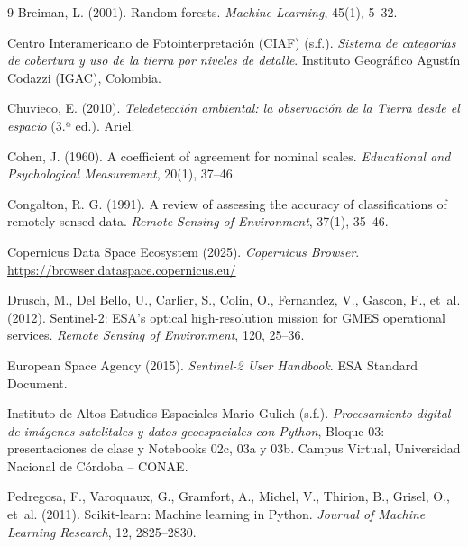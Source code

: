 \documentclass[11pt,letterpaper]{article}
\begin{document}
\begin{thebibliography}{9}
Breiman, L. (2001). Random forests. \textit{Machine Learning}, 45(1), 5--32.

Centro Interamericano de Fotointerpretación (CIAF) (s.f.). \textit{Sistema de categorías de cobertura y
uso de la tierra por niveles de detalle}. Instituto Geográfico Agustín Codazzi (IGAC), Colombia.

Chuvieco, E. (2010). \textit{Teledetección ambiental: la observación de la Tierra desde el espacio}
(3.ª ed.). Ariel.

Cohen, J. (1960). A coefficient of agreement for nominal scales. \textit{Educational and Psychological
Measurement}, 20(1), 37--46.

Congalton, R. G. (1991). A review of assessing the accuracy of classifications of remotely sensed data.
\textit{Remote Sensing of Environment}, 37(1), 35--46.

Copernicus Data Space Ecosystem (2025). \textit{Copernicus Browser}.
\url{https://browser.dataspace.copernicus.eu/}

Drusch, M., Del Bello, U., Carlier, S., Colin, O., Fernandez, V., Gascon, F., et~al. (2012). Sentinel-2:
ESA's optical high-resolution mission for GMES operational services. \textit{Remote Sensing of
Environment}, 120, 25--36.

European Space Agency (2015). \textit{Sentinel-2 User Handbook}. ESA Standard Document.

Instituto de Altos Estudios Espaciales Mario Gulich (s.f.). \textit{Procesamiento digital de imágenes
satelitales y datos geoespaciales con Python}, Bloque 03: presentaciones de clase y Notebooks 02c, 03a y
03b. Campus Virtual, Universidad Nacional de Córdoba -- CONAE.

Pedregosa, F., Varoquaux, G., Gramfort, A., Michel, V., Thirion, B., Grisel, O., et~al. (2011).
Scikit-learn: Machine learning in Python. \textit{Journal of Machine Learning Research}, 12, 2825--2830.
\end{thebibliography}
\end{document}
